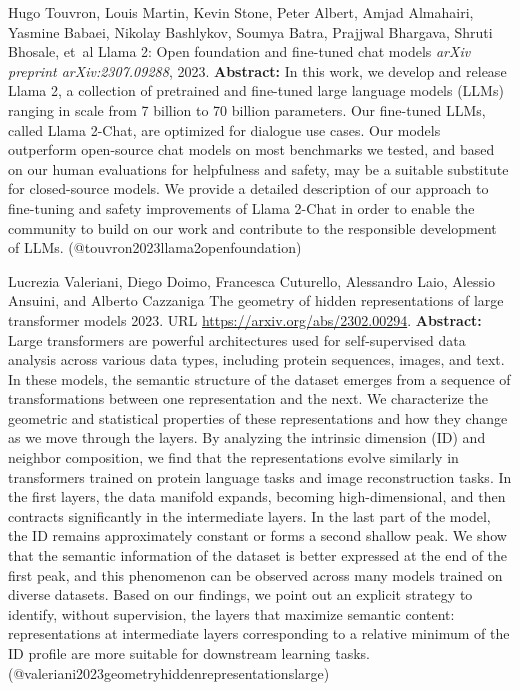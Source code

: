 \documentclass{article} %
\begin{document}
\begin{thebibliography}{}
 Hugo Touvron, Louis Martin, Kevin Stone, Peter Albert, Amjad Almahairi, Yasmine Babaei, Nikolay Bashlykov, Soumya Batra, Prajjwal Bhargava, Shruti Bhosale, et~al \newblock Llama 2: Open foundation and fine-tuned chat models \newblock \emph{arXiv preprint arXiv:2307.09288}, 2023. \newblock \textbf{Abstract:} In this work, we develop and release Llama 2, a collection of pretrained and fine-tuned large language models (LLMs) ranging in scale from 7 billion to 70 billion parameters. Our fine-tuned LLMs, called Llama 2-Chat, are optimized for dialogue use cases. Our models outperform open-source chat models on most benchmarks we tested, and based on our human evaluations for helpfulness and safety, may be a suitable substitute for closed-source models. We provide a detailed description of our approach to fine-tuning and safety improvements of Llama 2-Chat in order to enable the community to build on our work and contribute to the responsible development of LLMs. \newblock (@touvron2023llama2openfoundation)

 Lucrezia Valeriani, Diego Doimo, Francesca Cuturello, Alessandro Laio, Alessio Ansuini, and Alberto Cazzaniga \newblock The geometry of hidden representations of large transformer models 2023. \newblock URL \url{https://arxiv.org/abs/2302.00294}. \newblock \textbf{Abstract:} Large transformers are powerful architectures used for self-supervised data analysis across various data types, including protein sequences, images, and text. In these models, the semantic structure of the dataset emerges from a sequence of transformations between one representation and the next. We characterize the geometric and statistical properties of these representations and how they change as we move through the layers. By analyzing the intrinsic dimension (ID) and neighbor composition, we find that the representations evolve similarly in transformers trained on protein language tasks and image reconstruction tasks. In the first layers, the data manifold expands, becoming high-dimensional, and then contracts significantly in the intermediate layers. In the last part of the model, the ID remains approximately constant or forms a second shallow peak. We show that the semantic information of the dataset is better expressed at the end of the first peak, and this phenomenon can be observed across many models trained on diverse datasets. Based on our findings, we point out an explicit strategy to identify, without supervision, the layers that maximize semantic content: representations at intermediate layers corresponding to a relative minimum of the ID profile are more suitable for downstream learning tasks. \newblock (@valeriani2023geometryhiddenrepresentationslarge)


\end{thebibliography}
\end{document}

